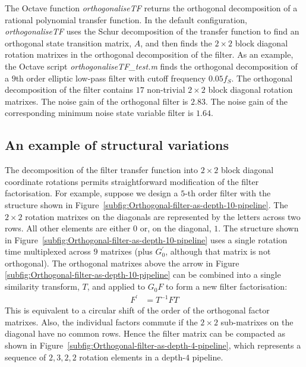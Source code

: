 \documentclass[a4paper,twoside,10pt,english]{report}
\begin{document}
The Octave function \emph{orthogonaliseTF} returns the orthogonal decomposition
of a rational polynomial transfer function. In the default configuration, 
\emph{orthogonaliseTF} uses the Schur decomposition of the transfer function
to find an orthogonal state transition matrix, $A$, and then finds the 
$2\times{}2$ block diagonal rotation matrixes in the orthogonal 
decomposition of the filter. As an example, the Octave script 
\emph{orthogonaliseTF\_test.m} finds the orthogonal decomposition of a $9$th
order elliptic low-pass filter with cutoff frequency $0.05f_{S}$. The orthogonal
decomposition of the filter contains $17$ non-trivial $2\times{}2$ block diagonal
rotation matrixes. The noise gain of the orthogonal filter is $2.83$. The noise
gain of the corresponding minimum noise state variable filter is $1.64$. 
\subsection{An example of structural variations}
The decomposition of the filter transfer function into $2\times{}2$ block
diagonal coordinate rotations permits straightforward modification of the
filter factorisation. For example, suppose we design a $5$-th order 
filter with the structure shown in
Figure~\ref{subfig:Orthogonal-filter-as-depth-10-pipeline}. The $2\times2$
rotation matrixes on the diagonals are represented by the letters across two
rows. All other elements are either $0$ or, on the diagonal, $1$.
The structure shown in 
Figure~\ref{subfig:Orthogonal-filter-as-depth-10-pipeline}
uses a single rotation time multiplexed across $9$ matrixes
(plus $G_{0}^{\prime}$, although that matrix is not orthogonal).
The orthogonal matrixes above the arrow in Figure 
\ref{subfig:Orthogonal-filter-as-depth-10-pipeline}
can be combined into a single similarity transform, $T$, and applied
to $G_{0}F$ to form a new filter factorisation: 
\begin{align*}
F^{\prime} &= T^{-1}FT
\end{align*}
This is equivalent to a circular shift of the order of the orthogonal
factor matrixes. Also, the individual factors commute if the $2\times2$
sub-matrixes on the diagonal have no common rows. Hence the filter
matrix can be compacted as shown in 
Figure~\ref{subfig:Orthogonal-filter-as-depth-4-pipeline},
which represents a sequence of $2,3,2,2$ rotation elements in a depth-$4$
pipeline.
\end{document}
